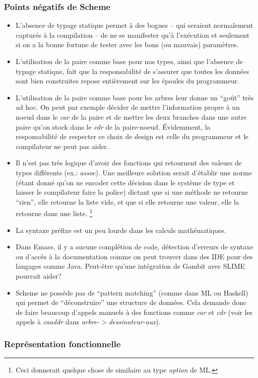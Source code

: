 \documentclass[10pt]{report}
\begin{document}
\subsubsection{Points négatifs de Scheme}
\begin{itemize}
\item L'absence de typage statique permet à des bogues -- qui seraient
  normalement capturés à la compilation -- de ne se manifester qu'à
  l'exécution et seulement si on a la bonne fortune de tester avec les
  bons (ou mauvais) paramètres.
\item L'utilisation de la paire comme base pour nos types, ainsi que
  l'absence de typage statique, fait que la responsabilité de
  s'assurer que toutes les données sont bien construites repose
  entièrement sur les épaules du programmeur.
\item L'utilisation de la paire comme base pour les arbres leur donne
  un ``goût'' très ad hoc.  On peut par exemple décider de mettre
  l'information propre à un noeud dans le \emph{car} de la paire et de
  mettre les deux branches dans une autre paire qu'on stock dans le
  \emph{cdr} de la paire-noeud.  Évidemment, la responsabilité de
  respecter ce choix de design est celle du programmeur et le
  compilateur ne peut pas aider.
\item Il n'est pas très logique d'avoir des fonctions qui retournent
  des valeurs de types différents (ex.: \emph{assoc}).  Une meilleure
  solution serait d'établir une norme (étant donné qu'on ne encoder
  cette décision dans le système de type et laisser le compilateur
  faire la police) dictant que si une méthode ne retourne ``rien'',
  elle retourne la liste vide, et que si elle retourne une valeur,
  elle la retourne dans une liste. \footnote{Ceci donnerait quelque
    chose de similaire au type \emph{option} de ML.}
\item La syntaxe préfixe est un peu lourde dans les calculs
  mathématiques.
\item Dans Emacs, il y a aucune complétion de code, détection
  d'erreurs de syntaxe ou d'accès à la documentation comme on peut
  trouver dans des IDE pour des langages comme Java.  Peut-être qu'une
  intégration de Gambit avec SLIME pourrait aider?
\item Scheme ne possède pas de ``pattern matching'' (comme dans ML ou
  Haskell) qui permet de ``déconstruire'' une structure de données.
  Cela demande donc de faire beaucoup d'appels manuels à des fonctions
  comme \emph{car} et \emph{cdr} (voir les appels à \emph{caaddr} dans
  \emph{arbre-$>$dessinateur-aux}).
\end{itemize}

\subsubsection{Représentation fonctionnelle}
\end{document}
